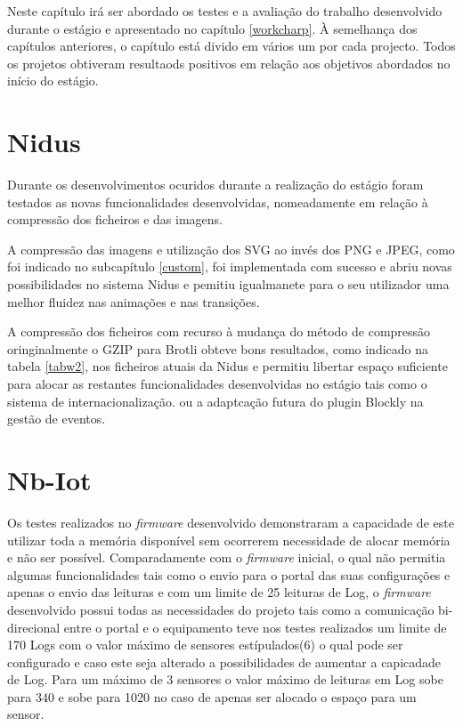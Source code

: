\par Neste capítulo irá ser abordado os testes e a avaliação do trabalho desenvolvido durante o estágio e apresentado no capítulo \ref{workcharp}. À semelhança dos capítulos anteriores, o capítulo está divido em vários um por cada projecto. Todos os projetos obtiveram resultaods positivos em relação aos objetivos abordados no início do estágio.

\section{Nidus}

\par Durante os desenvolvimentos ocuridos durante a realização do estágio foram testados as novas funcionalidades desenvolvidas, nomeadamente em relação à compressão dos ficheiros e das imagens. 
\par A compressão das imagens e utilização dos SVG ao invés dos PNG e JPEG, como foi indicado no subcapítulo \ref{custom}, foi implementada com sucesso e abriu novas possibilidades  no sistema Nidus e pemitiu igualmanete para o seu utilizador uma melhor fluidez nas animações e nas transições.
\par A compressão dos ficheiros com recurso à mudança do método de compressão oringinalmente o GZIP para Brotli obteve bons resultados, como indicado na tabela \ref{tabw2}, nos ficheiros atuais da Nidus e permitiu libertar espaço suficiente para alocar as restantes funcionalidades desenvolvidas no estágio tais como o sistema de internacionalização. ou a adaptcação futura do plugin Blockly na gestão de eventos.

\section{Nb-Iot}

\par Os testes realizados no \textit{firmware} desenvolvido demonstraram a capacidade de este utilizar toda a memória disponível sem ocorrerem necessidade de alocar memória e não ser possível. Comparadamente com o \textit{firmware} inicial, o qual não permitia algumas funcionalidades tais como o envio para o portal das suas configurações e apenas o envio das leituras e com um limite de 25 leituras de Log, o \textit{firmware} desenvolvido possui todas as necessidades do projeto tais como a comunicação bi-direcional entre o portal e o equipamento teve nos testes realizados um limite de 170 Logs com o valor máximo de sensores estípulados(6) o qual pode ser configurado e caso este seja alterado a possibilidades de aumentar a capicadade de Log. Para um máximo de 3 sensores o valor máximo de leituras em Log sobe para 340 e sobe para 1020 no caso de apenas ser alocado o espaço para um sensor.

